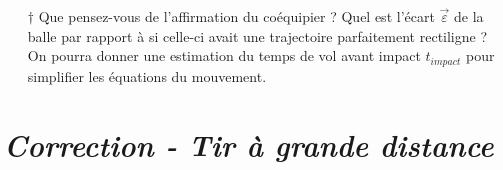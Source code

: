 \documentclass{report}
\begin{document}
\begin{itemize}
	
	\item[$\dagger$] Que pensez-vous de l'affirmation du coéquipier ? Quel est l'écart $\vec{\varepsilon}$ de la balle par rapport à si celle-ci avait une trajectoire parfaitement rectiligne ? On pourra donner une estimation du temps de vol avant impact $t_{impact}$ pour simplifier les équations du mouvement.

\end{itemize}

\newpage

\section*{\textit{Correction - Tir à grande distance}}
\end{document}
